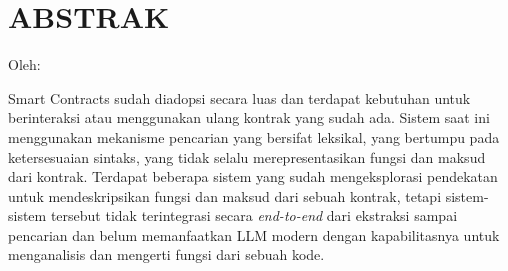 \clearpage
\chapter*{ABSTRAK}
\begin{center}
	\center
	\begin{singlespace}
		\large\bfseries\MakeUppercase{\thetitle}

		\normalfont\normalsize
		Oleh:

		\bfseries \theauthor
	\end{singlespace}
\end{center}

\begin{singlespace}
	\small


	Smart Contracts sudah diadopsi secara luas dan terdapat kebutuhan untuk berinteraksi atau menggunakan ulang kontrak yang sudah ada. Sistem saat ini menggunakan mekanisme pencarian yang bersifat leksikal, yang bertumpu pada ketersesuaian sintaks, yang tidak selalu merepresentasikan fungsi dan maksud dari kontrak. Terdapat beberapa sistem yang sudah mengeksplorasi pendekatan untuk mendeskripsikan fungsi dan maksud dari sebuah kontrak, tetapi sistem-sistem tersebut tidak terintegrasi secara \textit{end-to-end} dari ekstraksi sampai pencarian dan belum memanfaatkan LLM modern dengan kapabilitasnya untuk menganalisis dan mengerti fungsi dari sebuah kode.


\end{singlespace}
